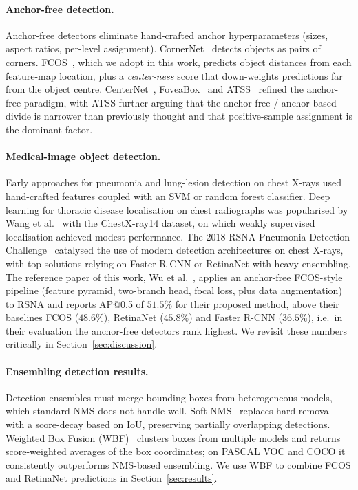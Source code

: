\documentclass[11pt,a4paper]{article}
\begin{document}
\paragraph{Anchor-free detection.}
Anchor-free detectors eliminate hand-crafted anchor hyperparameters (sizes, aspect ratios, per-level assignment). CornerNet~\cite{law2018cornernet} detects objects as pairs of corners. FCOS~\cite{tian2019fcos}, which we adopt in this work, predicts object distances from each feature-map location, plus a \emph{center-ness} score that down-weights predictions far from the object centre. CenterNet~\cite{zhou2019centernet}, FoveaBox~\cite{kong2020foveabox} and ATSS~\cite{zhang2020atss} refined the anchor-free paradigm, with ATSS further arguing that the anchor-free / anchor-based divide is narrower than previously thought and that positive-sample assignment is the dominant factor.

\paragraph{Medical-image object detection.}
Early approaches for pneumonia and lung-lesion detection on chest X-rays used hand-crafted features coupled with an SVM or random forest classifier. Deep learning for thoracic disease localisation on chest radiographs was popularised by Wang et al.~\cite{wang2017chestxray} with the ChestX-ray14 dataset, on which weakly supervised localisation achieved modest performance. The 2018 RSNA Pneumonia Detection Challenge~\cite{shih2019rsna} catalysed the use of modern detection architectures on chest X-rays, with top solutions relying on Faster R-CNN or RetinaNet with heavy ensembling. The reference paper of this work, Wu et al.~\cite{wu2024pneumonia}, applies an anchor-free FCOS-style pipeline (feature pyramid, two-branch head, focal loss, plus data augmentation) to RSNA and reports AP@0.5 of $51.5\%$ for their proposed method, above their baselines FCOS ($48.6\%$), RetinaNet ($45.8\%$) and Faster R-CNN ($36.5\%$), i.e.\ in their evaluation the anchor-free detectors rank highest. We revisit these numbers critically in Section~\ref{sec:discussion}.

\paragraph{Ensembling detection results.}
Detection ensembles must merge bounding boxes from heterogeneous models, which standard NMS does not handle well. Soft-NMS~\cite{bodla2017softnms} replaces hard removal with a score-decay based on IoU, preserving partially overlapping detections. Weighted Box Fusion (WBF)~\cite{solovyev2021wbf} clusters boxes from multiple models and returns score-weighted averages of the box coordinates; on PASCAL VOC and COCO it consistently outperforms NMS-based ensembling. We use WBF to combine FCOS and RetinaNet predictions in Section~\ref{sec:results}.
\end{document}
